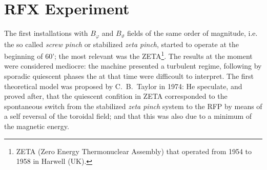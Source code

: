 \section{RFX Experiment}
The first installations with $B_\varphi$ and $B_\vartheta$ fields of the same order of magnitude, i.e. the so called \textit{screw pinch} or stabilized \textit{zeta pinch}, started to operate at the beginning of 60'; the most relevant was the ZETA\footnote{ZETA (Zero Energy Thermonuclear Assembly) that operated from 1954 to 1958 in Harwell (UK).}. The results at the moment were considered mediocre: the machine presented a turbulent regime, following by sporadic quiescent phases the at that time were difficoult to interpret. The first theoretical model was proposed by C.~B.~Taylor in 1974\cite{taylor}: He speculate, and proved after, that the quiescent confition in ZETA corresponded to the spontaneous switch from the stabilized \textit{zeta pinch} system to the RFP by means of a self reversal of the toroidal field; and that this was also due to a minimum of the magnetic energy.

